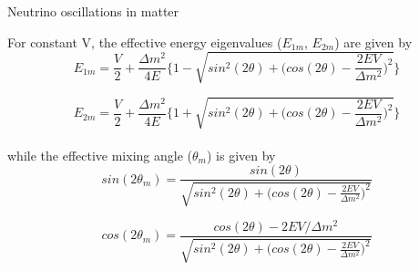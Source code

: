 %
%
%

\begin{frame}{Neutrino oscillations in matter}

For constant V, the effective energy eigenvalues ($E_{1m}$, $E_{2m}$) are given by
\begin{equation}
  \nonumber
  E_{1m} = \frac{V}{2} + \frac{\Delta m^2}{4E}
    \Big\{ 1 - \sqrt{sin^2(2\theta) +
       \Big( cos(2\theta) - \frac{2EV}{\Delta m^2} \Big)^2} \Big\}
\end{equation}

\begin{equation}
  \nonumber
  E_{2m} = \frac{V}{2} + \frac{\Delta m^2}{4E}
    \Big\{ 1 + \sqrt{sin^2(2\theta) +
       \Big( cos(2\theta) - \frac{2EV}{\Delta m^2} \Big)^2} \Big\}
\end{equation}\\

while the effective mixing angle ($\theta_m$) is given by
\begin{equation}
  \nonumber
  sin(2\theta_m) =
    \frac{sin(2\theta)}{\sqrt{sin^2(2\theta) +
       \Big( cos(2\theta) - \frac{2EV}{\Delta m^2} \Big)^2}}
\end{equation}

\begin{equation}
  \nonumber
  cos(2\theta_m) =
    \frac{cos(2\theta)-2EV/\Delta m^2}{\sqrt{sin^2(2\theta) +
       \Big( cos(2\theta) - \frac{2EV}{\Delta m^2} \Big)^2}}
\end{equation}

\end{frame}

%
%
%


